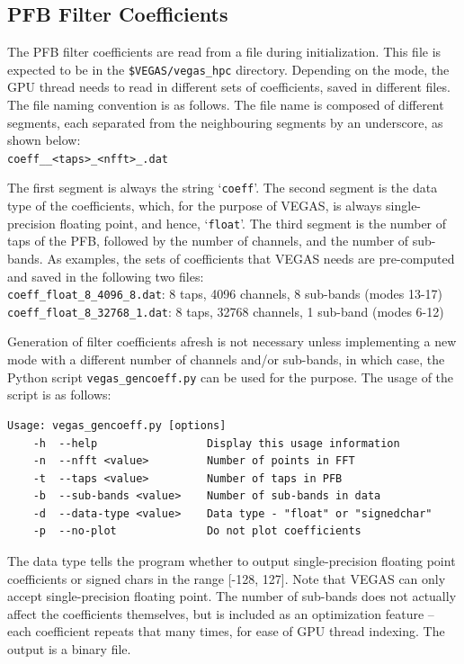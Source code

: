\documentclass[11pt]{article} %
\begin{document}
\subsection{PFB Filter Coefficients} \label{filtercoeff}

The PFB filter coefficients are read from a file during initialization. This
file is expected to be in the {\tt \$VEGAS/vegas\_hpc} directory.
Depending on the mode, the GPU thread needs to read in different sets
of coefficients, saved in different files. The file naming convention is as
follows. The file name is composed of different segments, each separated from
the neighbouring segments by an underscore, as shown below:\\
{\tt coeff\_<data-type>\_<taps>\_<nfft>\_<sub-bands>.dat}

The first segment is always the string `{\tt coeff}'. The second segment is the
data type of the coefficients, which, for the purpose of VEGAS, is always
single-precision floating point, and hence, `{\tt float}'. The third segment
is the number of taps of the PFB, followed by
the number of channels, and the number of sub-bands. As examples, the sets of
coefficients that VEGAS needs are pre-computed and saved in the following two
files:\\
{\tt coeff\_float\_8\_4096\_8.dat}: 8 taps, 4096 channels, 8 sub-bands (modes
13-17)\\
{\tt coeff\_float\_8\_32768\_1.dat}: 8 taps, 32768 channels, 1 sub-band (modes
6-12)

Generation of filter coefficients afresh is not necessary unless implementing
a new mode with a different number of channels and/or sub-bands, in which case,
the Python script {\tt vegas\_gencoeff.py} can be used for the purpose. The
usage of the script is as follows:

\begin{verbatim}
Usage: vegas_gencoeff.py [options]
    -h  --help                 Display this usage information
    -n  --nfft <value>         Number of points in FFT
    -t  --taps <value>         Number of taps in PFB
    -b  --sub-bands <value>    Number of sub-bands in data
    -d  --data-type <value>    Data type - "float" or "signedchar"
    -p  --no-plot              Do not plot coefficients
\end{verbatim}

The data type tells the program whether to output single-precision floating
point coefficients or signed chars in the range [-128, 127]. Note that
VEGAS can only accept single-precision floating point. The number of sub-bands
does not actually affect the coefficients themselves, but is included as an
optimization feature -- each coefficient repeats that many times, for ease of
GPU thread indexing. The output is a binary file.
\end{document}
